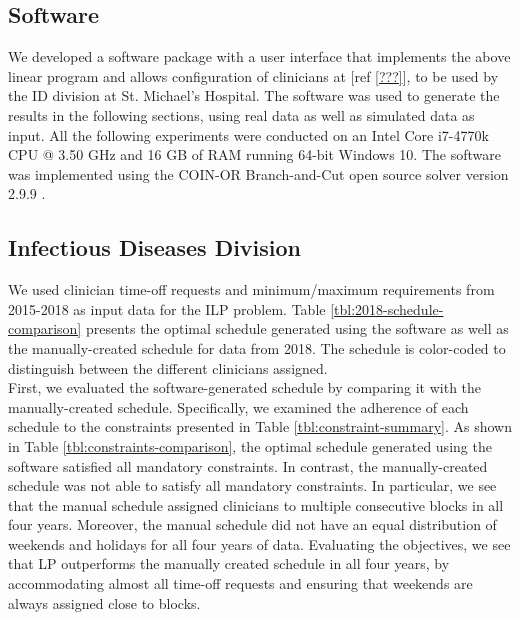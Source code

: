 \subsection{Software}
We developed a software package with a user interface that implements the above linear program and allows configuration of clinicians at [ref \ref{???}], to be used by the ID division at St. Michael's Hospital. The software was used to generate the results in the following sections, using real data as well as simulated data as input. All the following experiments were conducted on an Intel Core i7-4770k CPU @ 3.50 GHz and 16 GB of RAM running 64-bit Windows 10. The software was implemented using the COIN-OR Branch-and-Cut open source solver version 2.9.9 \cite{johnjforrest_coin-or/cbc:_2019}.

\subsection{Infectious Diseases Division}  %
We used clinician time-off requests and minimum/maximum requirements from 2015-2018 as input data for the ILP problem. Table \ref{tbl:2018-schedule-comparison} presents the optimal schedule generated using the software as well as the manually-created schedule for data from 2018. The schedule is color-coded to distinguish between the different clinicians assigned. \\



First, we evaluated the software-generated schedule by comparing it with the manually-created schedule. Specifically, we examined the adherence of each schedule to the constraints presented in Table \ref{tbl:constraint-summary}. As shown in Table \ref{tbl:constraints-comparison}, the optimal schedule generated using the software satisfied all mandatory constraints. In contrast, the manually-created schedule was not able to satisfy all mandatory constraints. In particular, we see that the manual schedule assigned clinicians to multiple consecutive blocks in all four years. Moreover, the manual schedule did not have an equal distribution of weekends and holidays for all four years of data. Evaluating the objectives, we see that LP outperforms the manually created schedule in all four years, by accommodating almost all time-off requests and ensuring that weekends are always assigned close to blocks. \\

